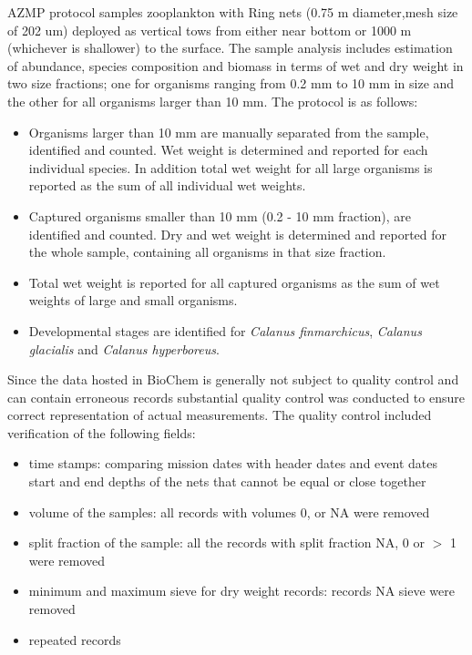 \documentclass[letterpaper,portrait,11pt]{scrartcl}
\numberwithin{equation}{section}		%
\numberwithin{figure}{section}		%
\numberwithin{table}{section}				%
\begin{document}
\begin{appendices}
AZMP protocol samples zooplankton with Ring nets (0.75 m diameter,mesh size of 202 um) deployed as vertical tows from either near bottom or 1000 m (whichever is shallower) to the surface. The sample analysis includes estimation of abundance, species composition and biomass in terms of wet and dry weight in two size fractions; one for organisms ranging from 0.2 mm to 10 mm in size and the other for all organisms larger than 10 mm.  The protocol is as follows:

\begin{itemize}
  \item Organisms larger than 10 mm are manually separated from the sample, identified and counted. Wet weight is determined and reported for each individual species. In addition total wet weight for all large organisms is reported as the sum of all individual wet weights.
  \item Captured organisms smaller than 10 mm (0.2 - 10 mm fraction), are identified and counted. Dry and wet weight is determined and reported for the whole sample, containing all organisms in that size fraction.
  \item Total wet weight is reported for all captured organisms as the sum of wet weights of large and small organisms.
  \item Developmental stages are identified for \textit{Calanus finmarchicus}, \textit{Calanus glacialis} and \textit{Calanus hyperboreus}. 
\end{itemize}


Since the data hosted in BioChem is generally not subject to quality control and can contain erroneous records substantial quality control was conducted to ensure correct representation of actual measurements. The quality control included verification of the following fields: 

\begin{itemize}
  \item time stamps: comparing mission dates with header dates and event dates 
  start and end depths of the nets that cannot be equal or close together
  \item volume of the samples: all records with volumes 0, or NA were removed
  \item split fraction of the sample: all the records with split fraction NA, 0 or $>$ 1 were removed 
  \item minimum and maximum sieve for dry weight records: records NA sieve were removed
  \item repeated records 
\end{itemize}



\end{appendices}
\end{document}

